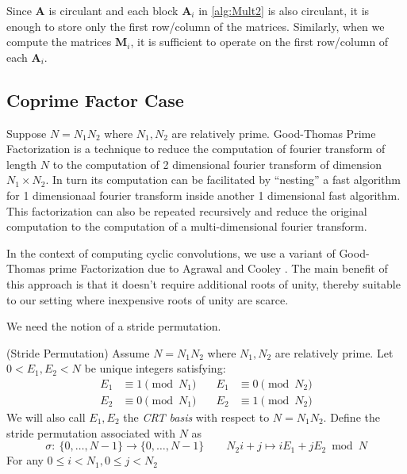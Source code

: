 \begin{remark}
    Since \(\bm{A}\) is circulant and each block \(\bm{A}_i\) in \cref{alg:Mult2} is also circulant, it is enough to store only the first row/column of the matrices. Similarly, when we compute the matrices \(\bm{M}_i\), it is sufficient to operate on the first row/column of each \(\bm{A}_i\).
\end{remark}

\subsection{Coprime Factor Case} \label{subsection:coprime}
Suppose \(N = N_1 N_2\) where \(N_1, N_2\) are relatively prime. Good-Thomas Prime Factorization \cite{JRSS:Good58,ADC:Thomas63} is a technique to reduce the computation of fourier transform of length \(N\) to the computation of 2 dimensional fourier transform of dimension \(N_1 \times N_2\). In turn its computation can be facilitated by ``nesting'' a fast algorithm for 1 dimensionaal fourier transform inside another 1 dimensional fast algorithm. This factorization can also be repeated recursively and reduce the original computation to the computation of a multi-dimensional fourier transform.

In the context of computing cyclic convolutions, we use a variant of Good-Thomas prime Factorization due to Agrawal and Cooley \cite{IEEE:AgrCoo77}. The main benefit of this approach is that it doesn't require additional roots of unity, thereby suitable to our setting where inexpensive roots of unity are scarce.

We need the notion of a stride permutation.
\begin{definition}{(Stride Permutation)}\label{def:Stride}
    Assume \(N = N_1 N_2\) where \(N_1, N_2\) are relatively prime. Let \(0 < E_1, E_2 < N\) be unique integers satisfying:
    \begin{align*}
        E_1 &\equiv 1 \pmod{N_1} \quad &E_1 &\equiv 0 \pmod{N_2} \\
        E_2 &\equiv 0 \pmod{N_1} \quad &E_2 &\equiv 1 \pmod{N_2}
    \end{align*}
    We will also call \(E_1, E_2\) the \emph{CRT basis} with respect to \(N=N_1 N_2\). Define the stride permutation associated with \(N\) as
    \[\sigma:\: \{0,\ldots, N-1\} \to \{0, \ldots, N-1\} \qquad N_2 i + j \mapsto i E_1 + j E_2 \bmod N\]
    For any \(0 \le i < N_1, 0 \le j < N_2\)
\end{definition}

